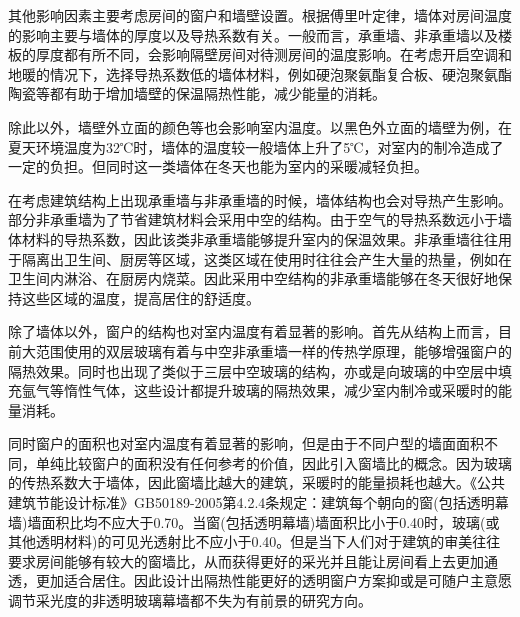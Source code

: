 其他影响因素主要考虑房间的窗户和墙壁设置。根据傅里叶定律，墙体对房间温度的影响主要与墙体的厚度以及导热系数有关。一般而言，承重墙、非承重墙以及楼板的厚度都有所不同，会影响隔壁房间对待测房间的温度影响。在考虑开启空调和地暖的情况下，选择导热系数低的墙体材料，例如硬泡聚氨酯复合板、硬泡聚氨酯陶瓷等都有助于增加墙壁的保温隔热性能，减少能量的消耗。

除此以外，墙壁外立面的颜色等也会影响室内温度。以黑色外立面的墙壁为例，在夏天环境温度为32℃时，墙体的温度较一般墙体上升了5℃，对室内的制冷造成了一定的负担。但同时这一类墙体在冬天也能为室内的采暖减轻负担。

在考虑建筑结构上出现承重墙与非承重墙的时候，墙体结构也会对导热产生影响。部分非承重墙为了节省建筑材料会采用中空的结构。由于空气的导热系数远小于墙体材料的导热系数，因此该类非承重墙能够提升室内的保温效果。非承重墙往往用于隔离出卫生间、厨房等区域，这类区域在使用时往往会产生大量的热量，例如在卫生间内淋浴、在厨房内烧菜。因此采用中空结构的非承重墙能够在冬天很好地保持这些区域的温度，提高居住的舒适度。

除了墙体以外，窗户的结构也对室内温度有着显著的影响。首先从结构上而言，目前大范围使用的双层玻璃有着与中空非承重墙一样的传热学原理，能够增强窗户的隔热效果。同时也出现了类似于三层中空玻璃的结构，亦或是向玻璃的中空层中填充氩气等惰性气体，这些设计都提升玻璃的隔热效果，减少室内制冷或采暖时的能量消耗。

同时窗户的面积也对室内温度有着显著的影响，但是由于不同户型的墙面面积不同，单纯比较窗户的面积没有任何参考的价值，因此引入窗墙比的概念。因为玻璃的传热系数大于墙体，因此窗墙比越大的建筑，采暖时的能量损耗也越大。《公共建筑节能设计标准》GB50189-2005第4.2.4条规定：建筑每个朝向的窗(包括透明幕墙)墙面积比均不应大于0.70。当窗(包括透明幕墙)墙面积比小于0.40时，玻璃(或其他透明材料)的可见光透射比不应小于0.40。但是当下人们对于建筑的审美往往要求房间能够有较大的窗墙比，从而获得更好的采光并且能让房间看上去更加通透，更加适合居住。因此设计出隔热性能更好的透明窗户方案抑或是可随户主意愿调节采光度的非透明玻璃幕墙都不失为有前景的研究方向。
